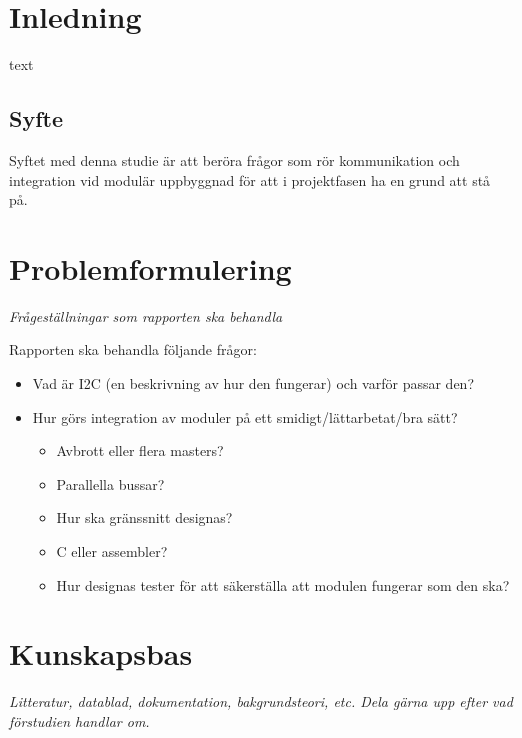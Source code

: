 \documentclass[11pt]{article}
\begin{document}
\begin{flushleft}

\section{Inledning}
text \cite{893287}

\subsection{Syfte}
Syftet med denna studie är att beröra frågor som rör kommunikation och integration vid modulär uppbyggnad för att i projektfasen ha en grund att stå på.

\pagebreak

\section{Problemformulering}
\textit{Frågeställningar som rapporten ska behandla}

Rapporten ska behandla följande frågor:

\begin{itemize}
	\item Vad är I2C (en beskrivning av hur den fungerar) och varför passar den?
	\item Hur görs integration av moduler på ett smidigt/lättarbetat/bra sätt?
	
		\begin{itemize}
			\item Avbrott eller flera masters?
			\item Parallella bussar?
			\item Hur ska gränssnitt designas?
			\item C eller assembler?
			\item Hur designas tester för att säkerställa att modulen fungerar som den ska?
		\end{itemize}

\end{itemize}

\pagebreak

\section{Kunskapsbas}
\textit{Litteratur, datablad, dokumentation, bakgrundsteori, etc. Dela gärna upp efter vad förstudien handlar om.}


\end{flushleft}
\end{document}
